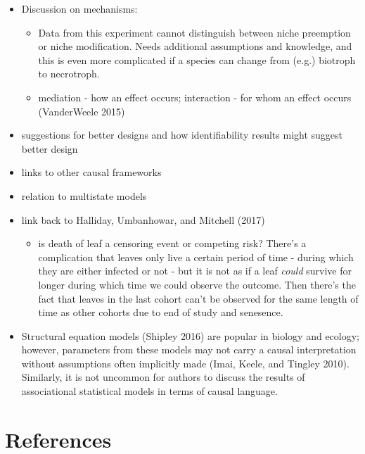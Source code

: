 \documentclass[]{article}
\providecommand{\tightlist}{%
  \setlength{\itemsep}{0pt}\setlength{\parskip}{0pt}}
\begin{document}
\begin{itemize}
\tightlist
\item
  Discussion on mechanisms:

  \begin{itemize}
  \tightlist
  \item
    Data from this experiment cannot distinguish between niche
    preemption or niche modification. Needs additional assumptions and
    knowledge, and this is even more complicated if a species can change
    from (e.g.) biotroph to necrotroph.
  \item
    mediation - how an effect occurs; interaction - for whom an effect
    occurs (VanderWeele 2015)
  \end{itemize}
\item
  suggestions for better designs and how identifiability results might
  suggest better design
\item
  links to other causal frameworks
\item
  relation to multistate models
\item
  link back to Halliday, Umbanhowar, and Mitchell (2017)

  \begin{itemize}
  \tightlist
  \item
    is death of leaf a censoring event or competing risk? There's a
    complication that leaves only live a certain period of time - during
    which they are either infected or not - but it is not as if a leaf
    \emph{could} survive for longer during which time we could observe
    the outcome. Then there's the fact that leaves in the last cohort
    can't be observed for the same length of time as other cohorts due
    to end of study and senesence.
  \end{itemize}
\item
  Structural equation models (Shipley 2016) are popular in biology and
  ecology; however, parameters from these models may not carry a causal
  interpretation without assumptions often implicitly made (Imai, Keele,
  and Tingley 2010). Similarly, it is not uncommon for authors to
  discuss the results of associational statistical models in terms of
  causal language.
\end{itemize}

\hypertarget{references}{%
\section*{References}\label{references}}
\end{document}
